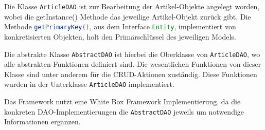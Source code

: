 Die Klasse \lstinline[style=java, language=java]{ArticleDAO} ist zur Bearbeitung der Artikel-Objekte angelegt
worden, wobei die getInstance() Methode das jeweilige Artikel-Objekt zurück gibt.
Die Methode \lstinline[style=java, language=java]{getPrimaryKey()}, aus dem Interface \lstinline[style=java, language=java]{Entity}, implementiert
von konkretisierten Objekten, holt den Primärschlüssel des jeweiligen Models.

Die abstrakte Klasse \lstinline[style=java, language=java]{AbstractDAO} ist hierbei die Oberklasse von 
\lstinline[style=java, language=java]{ArticleDAO}, wo alle abstrakten Funktionen definiert sind. Die wesentlichen
Funktionen von dieser Klasse sind unter anderem für die CRUD-Aktionen zuständig.
Diese Funktionen wurden in der Unterklasse \lstinline[style=java, language=java]{ArticleDAO} implementiert.

Das Framework nutzt eine White Box Framework Implementierung, da
 die konkreten DAO-Implementierungen die \lstinline[style=java,
language=java]{AbstractDAO} jeweils um notwendige Informationen ergänzen.

